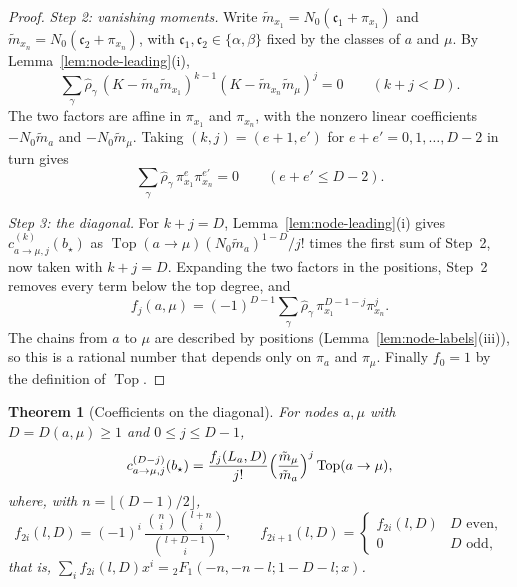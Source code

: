 \documentclass[twoside,10pt]{article}
\numberwithin{equation}{section}
\theoremstyle{slbody}
\newtheorem{theorem}{Theorem}[section]
\theoremstyle{definition}
\theoremstyle{remark}
\begin{document}
\begin{proof}
\emph{Step 2: vanishing moments.}  Write $\tilde m_{x_1}=N_0(\mathfrak c_1+\pi_{x_1})$
and $\tilde m_{x_n}=N_0(\mathfrak c_2+\pi_{x_n})$, with $\mathfrak c_1,\mathfrak c_2\in\{\alpha,\beta\}$
fixed by the classes of $a$ and $\mu$.  By Lemma~\ref{lem:node-leading}(i),
\[
 \sum_\gamma\hat\rho_\gamma\,(K-\tilde m_a\tilde m_{x_1})^{k-1}
 (K-\tilde m_{x_n}\tilde m_\mu)^j=0\qquad(k+j<D).
\]
The two factors are affine in $\pi_{x_1}$ and $\pi_{x_n}$, with the nonzero
linear coefficients $-N_0\tilde m_a$ and $-N_0\tilde m_\mu$.  Taking
$(k,j)=(e+1,e')$ for $e+e'=0,1,\dots,D-2$ in turn gives
\[
 \sum_\gamma\hat\rho_\gamma\,\pi_{x_1}^{e}\pi_{x_n}^{e'}=0\qquad(e+e'\leq D-2).
\]

\emph{Step 3: the diagonal.}  For $k+j=D$, Lemma~\ref{lem:node-leading}(i)
gives $c^{(k)}_{a\to\mu,j}(b_\star)$ as
$\operatorname{Top}(a\to\mu)(N_0\tilde m_a)^{1-D}/j!$ times the first sum of Step~2,
now taken with $k+j=D$.
Expanding the two factors in the positions, Step~2 removes every term below
the top degree, and
\[
 f_j(a,\mu)=(-1)^{D-1}\sum_\gamma\hat\rho_\gamma\,\pi_{x_1}^{D-1-j}\pi_{x_n}^j .
\]
The chains from $a$ to $\mu$ are described by positions
(Lemma~\ref{lem:node-labels}(iii)), so this is a rational number that depends
only on $\pi_a$ and $\pi_\mu$.  Finally $f_0=1$ by the definition of
$\operatorname{Top}$.
\end{proof}

\begin{theorem}[Coefficients on the diagonal]\label{thm:diagonal}
For nodes $a,\mu$ with $D=D(a,\mu)\geq1$ and $0\leq j\leq D-1$,
\[
 c^{(D-j)}_{a\to\mu,j}(b_\star)=\frac{f_j(L_a,D)}{j!}
 \Bigl(\frac{\tilde m_\mu}{\tilde m_a}\Bigr)^{j}\operatorname{Top}(a\to\mu),
\]
where, with $n=\lfloor(D-1)/2\rfloor$,
\[
 f_{2i}(l,D)=(-1)^i\,\frac{\binom ni\binom{l+n}i}{\binom{l+D-1}i},\qquad
 f_{2i+1}(l,D)=\begin{cases}f_{2i}(l,D)&D\text{ even},\\0&D\text{ odd},\end{cases}
\]
that is, $\sum_if_{2i}(l,D)x^i={}_2F_1(-n,-n-l;1-D-l;x)$.
\end{theorem}
\end{document}
